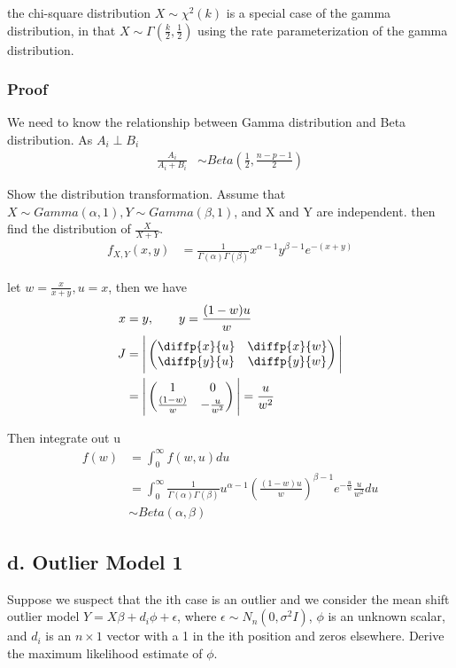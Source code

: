 the chi-square distribution $X \sim \chi^2(k)$ is a special case of the gamma distribution, in that $X \sim \Gamma(\frac{k}{2}, \frac{1}{2})$ using the rate parameterization of the gamma distribution.


\subsubsection{Proof}
We need to know the relationship between Gamma distribution and Beta distribution.
As $A_i \perp B_i$
\begin{align*}
	\frac{A_i}{A_i + B_i} & \sim Beta (\frac{1}{2} , \frac{n-p-1}{2}) 
\end{align*} 

Show the distribution transformation. Assume that $X \sim Gamma(\alpha, 1), Y \sim Gamma(\beta, 1)$, and X and Y are independent. then find the distribution of $\frac{X}{X+Y}$.
\begin{align*}
	f_{X,Y}(x, y) & =  \frac{1}{\Gamma(\alpha) \Gamma(\beta)} x^{\alpha-1} y^{\beta -1} e^{-(x+y)}
\end{align*} 

let $w= \frac{x}{x+y}, u= x$, then we have
\begin{align*}
	x & =  y, \qquad y= \frac{(1-w)u}{w} \\
	J &= \Bigg | \begin{pmatrix} 
	\diffp{x}{u} & \diffp{x}{w} \\
	\diffp{y}{u} & \diffp{y}{w} 
	\end{pmatrix}
	\Bigg | \\
	&=  \Bigg | \begin{pmatrix} 
		1 & 0\\
		\frac{(1-w)}{w} & -\frac{u}{w^2} 
	\end{pmatrix}
	\Bigg |  = \frac{u}{w^2}
\end{align*} 

Then integrate out u
\begin{align*}
	f(w) & = \int_{0}^{\infty} f(w,u) du \\
	& =  \int_{0}^{\infty}  \frac{1}{\Gamma(\alpha) \Gamma(\beta)} u^{\alpha-1} (\frac{(1-w)u}{w})^{\beta -1} e^{-\frac{u}{w}} \frac{u}{w^2} du \\
	& \sim Beta(\alpha, \beta)
\end{align*} 



\subsection{d. Outlier Model 1}
Suppose we suspect that the ith case is an outlier and we consider the mean shift outlier model
$Y= X \beta + d_i \phi + \epsilon$, where $\epsilon \sim N_n(0, \sigma^2 I)$, $\phi$ is an unknown scalar, and $d_i$ is an $n \times 1$ vector with a 1 in the ith position and zeros elsewhere.
Derive the maximum likelihood estimate of $\phi$.

